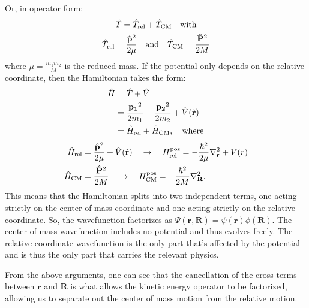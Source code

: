 Or, in operator form:
\begin{align*}
    \hat{T}= \hat{T}_{\text{rel}} &+ \hat{T}_{\text{CM}} \quad\text{with}\\
    \hat{T}_\text{rel}=\frac{\hat{\mathbf{p}}^2}{2\mu}\quad&\text{and}\quad\hat{T}_{\text{CM}}=\frac{\hat{\mathbf{P}}^2}{2M}
\end{align*}
where $\mu =\frac{m_1m_2}{M}$ is the reduced mass. If the potential only depends on the relative coordinate, then the Hamiltonian takes the form:
\begin{align*}
    \hat{H} & = \hat{T} + \hat{V} \\
            & = \frac{\mathbf{p_1}^2}{2m_1}+\frac{\mathbf{p_2}^2}{2m_2} + \hat{V}(\hat{\mathbf{r}})\\
            &= \hat{H}_{\text{rel}} + \hat{H}_{\text{CM}}, \quad\text{where}
\end{align*}
\begin{align}
    \hat{H}_\text{rel}&=\frac{\hat{\mathbf{p}}^2}{2\mu}+\hat{V}(\hat{\mathbf{r}})\quad\rightarrow\quad H^{\text{pos}}_\text{rel}=-\frac{\hbar^2}{2\mu}\nabla^2_{\mathbf{r}}+V(r)\label{eq:ham_rel}\\ 
    \hat{H}_\text{CM}&=\frac{\hat{\mathbf{P}}^2}{2M}\quad\rightarrow\quad H^{\text{pos}}_\text{CM}=-\frac{\hbar^2}{2M}\nabla^2_{\mathbf{R}}\nonumber.
\end{align}
This means that the Hamiltonian splits into two independent terms, one acting strictly on the center of mass coordinate and one acting strictly on the relative coordinate. So, the wavefunction factorizes as $\Psi(\mathbf{r}, \mathbf{R}) = \psi(\mathbf{r})\phi(\mathbf{R})$. The center of mass wavefunction includes no potential and thus evolves freely. The relative coordinate wavefunction is the only part that's affected by the potential and is thus the only part that carries the relevant physics. 

From the above arguments, one can see that the cancellation of the cross terms between $\mathbf{r}$ and $\mathbf{R}$ is what allows the kinetic energy operator to be factorized, allowing us to separate out the center of mass motion from the relative motion.

